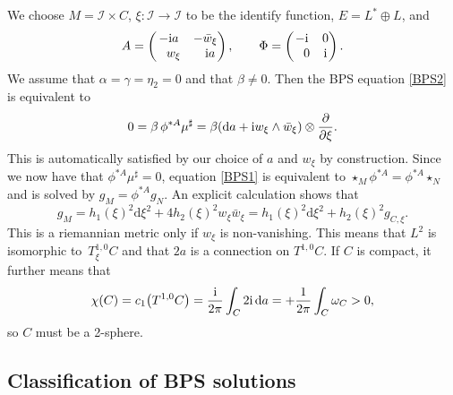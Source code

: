 \documentclass[pdftex]{sigma}
\newcommand{\II}{{\mathcal{I}}}
\newcommand{\1}{{\mathbb{1}}}
\def \d{\mathrm{d}}
\numberwithin{equation}{section}
\begin{document}
We choose $M=\II\times C$, $\xi\colon \II\to \II$ to be the identify function, $E=L^\ast\oplus L$, and
\begin{equation*}
A=\begin{pmatrix}-{\rm i}a & -\bar{w}_\xi \\ \hphantom{-} w_\xi & \hphantom{-}{\rm i} a \end{pmatrix},\qquad \Phi=\begin{pmatrix}-{\rm i} & 0 \\ \hphantom{-}0 & {\rm i} \end{pmatrix}.
\end{equation*}
We assume that $\alpha=\gamma=\eta_2=0$ and that $\beta\neq0$. Then the BPS equation \eqref{BPS2} is equivalent to
\begin{equation*}
0 = \beta\,\phi^{\ast A}\mu^\sharp = \beta(\d a +{\rm i}w_\xi\wedge\bar{w}_\xi)\otimes\frac{\partial}{\partial\xi}.
\end{equation*}
This is automatically satisfied by our choice of $a$ and $w_\xi$ by construction. Since we now have that $\phi^{\ast A}\mu^\sharp=0$, equation \eqref{BPS1} is equivalent to $\star_M\phi^{\ast A}=\phi^{\ast A}\star_N$ and is solved by $g_M=\phi^{\ast A} g_N$. An explicit calculation shows that
\begin{equation*}
g_M = h_1(\xi)^2\d\xi^2 + 4h_2(\xi)^2 w_\xi\bar{w}_\xi = h_1(\xi)^2\d\xi^2 + h_2(\xi)^2 g_{C,\xi}.
\end{equation*}
This is a riemannian metric only if $w_\xi$ is non-vanishing. This means that $L^2$ is isomorphic to~$T^{1,0}_\xi C$ and that $2a$ is a connection on $T^{1,0}C$. If $C$ is compact, it further means that
\begin{equation*}
\chi(C) = c_1\big(T^{1,0}C\big) = \frac{{\rm i}}{2\pi}\int_C 2{\rm i}\,\d a = +\frac{1}{2\pi}\int_C \omega_C > 0,
\end{equation*}
so $C$ must be a 2-sphere.

\subsection{Classification of BPS solutions}
\end{document}
